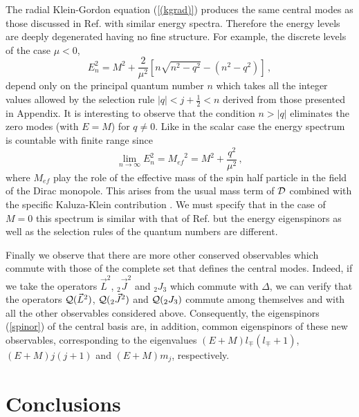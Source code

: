 \documentclass[a4paper,12pt]{article}
\begin{document}
The radial Klein-Gordon equation (\ref{(kgrad)}) produces the same central 
modes as those discussed in Ref.\cite{CV} with similar energy spectra. 
Therefore the energy levels are deeply degenerated having no fine structure. 
For example, the discrete levels of the case $\mu<0$, 
\begin{equation}\label{(een)}
E_{n}^{2}=M^{2}+\frac{2}{\mu^2}\left[n\sqrt{n^{2}-q^{2}}-(n^{2}-q^{2})
\right]\,,
\end{equation}        
depend only on the principal quantum number $n$ which takes all the integer 
values allowed by the selection rule $|q|<j+\frac{1}{2}<n$ derived from those 
presented in Appendix. It is interesting to observe that the condition $n>|q|$ 
eliminates the zero modes (with $E=M$) for $q\not =0$. Like in the scalar case 
the energy spectrum is countable with finite range since 
\begin{equation}
\lim_{n\to \infty} E_{n}^{2}={M_{ef}}^{2}=M^{2}+\frac{q^2}{\mu^2}\,,  
\end{equation}
where $M_{ef}$ play the role of the effective mass of the spin half particle 
in the field of the Dirac monopole. This arises from the usual mass term of 
${\cal D}$ combined with the specific Kaluza-Klein contribution 
\cite{DKK,DIRAC}. We must specify that in the case of $M=0$ this spectrum is 
similar with that of Ref.\cite{CH} but the energy eigenspinors as well as the 
selection rules of the quantum numbers are different.   

Finally we observe that there are more other conserved observables which 
commute with those of the complete set that defines the central modes. Indeed, 
if we take the operators $\vec{L}^{2}$, $_{2}\vec{J}^{2}$ and $_{2}J_{3}$ 
which commute with $\Delta$,  we can verify that the operators 
${\cal Q}(\vec{L}^{2})$, ${\cal Q}(_{2}\vec{J}^{2})$ and ${\cal Q}(_{2}J_{3})$ 
commute among themselves and with all the other observables considered above.  
Consequently, the eigenspinors (\ref{spinor}) of the central basis are, in 
addition, common  eigenspinors of these new  observables, corresponding to the 
eigenvalues   $(E+M)l_{\mp}(l_{\mp}+1)$, $(E+M)j(j+1)$ and $(E+M)m_{j}$, 
respectively.

\section{Conclusions}
\
\end{document}
